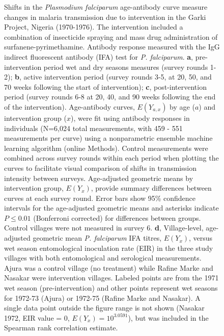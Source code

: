 \documentclass[11pt]{article}
\begin{document}
\begin{figure}[htbp]
\begin{center}
\begin{minipage}{\textwidth}
\caption{Shifts in the \textit{Plasmodium falciparum} age-antibody curve measure changes in malaria transmission due to intervention in the Garki Project, Nigeria (1970-1976). The intervention included a combination of insecticide spraying and mass drug administration of surfanene-pyrimethamine. Antibody response measured with the IgG indirect fluorescent antibody (IFA) test for \textit{P. falciparum}. \textbf{a}, pre-intervention period wet and dry seasons measures (survey rounds 1-2); \textbf{b}, active intervention period (survey rounds 3-5, at 20, 50, and 70 weeks following the start of intervention); \textbf{c}, post-intervention period (survey rounds 6-8 at 20, 40, and 90 weeks following the end of the intervention).  Age-antibody curves, $E(Y_{a,x})$ by age ($a$) and intervention group ($x$), were fit using antibody responses in individuals (N=6,024 total measurements, with 459 - 551 measurements per curve) using a nonparametric ensemble machine learning algorithm (online Methods). Control measurements were combined across survey rounds within each period when plotting the curves to facilitate visual comparison of shifts in transmission intensity between surveys. Age-adjusted geometric means by intervention group, $E(Y_x)$, provide summary differences between curves at each survey round. Error bars show 95\% confidence intervals for the age-adjusted geometric means and asterisks indicate $P\leq0.01$ (Bonferroni corrected) for differences between groups. Control villages were not measured in survey 6. \textbf{d}, Village-level, age-adjusted geometric mean \textit{P. falciparum} IFA titres, $E(Y_x)$, versus wet season entomological inoculation rate (EIR) in the three study villages with both entomological and serological measurements. Ajura was a control village (no treatment) while Rafine Marke and Nasakar were intervention villages.  Labeled points are from the 1971 wet season (pre-intervention) and other points represent wet seasons for 1972-73 (Ajura) or 1972-75 (Rafine Marke and Nasakar). A single data point outside the figure range is not shown (Nasakar 1972, EIR value = 0, $E(Y_x) = 10^{3.0591}$), but was included in the Spearman rank correlation estimate.  }
\label{fig:garki}
\end{minipage}
\end{center}
\end{figure}
\end{document}
